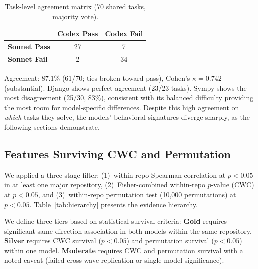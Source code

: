 \documentclass[11pt]{article}
\begin{document}
\begin{table}[t]
\centering
\caption{Task-level agreement matrix (70 shared tasks, majority vote).}
\label{tab:agreement}
\begin{tabular}{lcc}
\toprule
 & \textbf{Codex Pass} & \textbf{Codex Fail} \\
\midrule
\textbf{Sonnet Pass} & 27 & 7 \\
\textbf{Sonnet Fail} & 2 & 34 \\
\bottomrule
\end{tabular}
\end{table}

Agreement: 87.1\% (61/70; ties broken toward pass), Cohen's $\kappa = 0.742$ (substantial).
Django shows perfect agreement (23/23 tasks).
Sympy shows the most disagreement (25/30, 83\%), consistent with its balanced difficulty providing the most room for model-specific differences.
Despite this high agreement on \emph{which} tasks they solve, the models' behavioral signatures diverge sharply, as the following sections demonstrate.


\subsection{Features Surviving CWC and Permutation}
\label{sec:features}

We applied a three-stage filter: (1)~within-repo Spearman correlation at $p < 0.05$ in at least one major repository, (2)~Fisher-combined within-repo $p$-value (CWC) at $p < 0.05$, and (3)~within-repo permutation test (10,000 permutations) at $p < 0.05$.
Table~\ref{tab:hierarchy} presents the evidence hierarchy.

We define three tiers based on statistical survival criteria: \textbf{Gold} requires significant same-direction association in both models within the same repository.
\textbf{Silver} requires CWC survival ($p < 0.05$) and permutation survival ($p < 0.05$) within one model.
\textbf{Moderate} requires CWC and permutation survival with a noted caveat (failed cross-wave replication or single-model significance).
\end{document}
